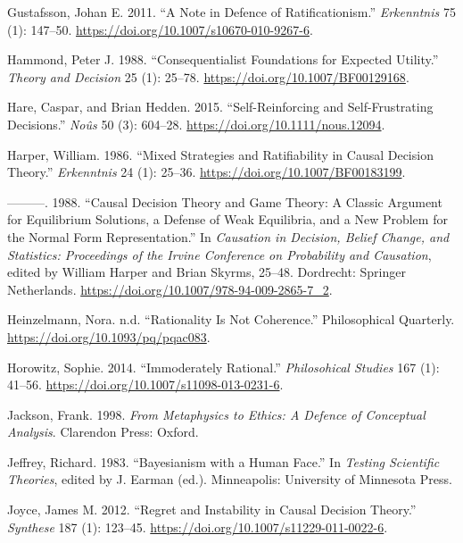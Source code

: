 \documentclass[
  12pt,
  letterpaper,
  DIV=11,
  numbers=noendperiod]{scrreprt}
\newlength{\cslhangindent}
\newlength{\cslentryspacingunit} %
\newenvironment{CSLReferences}[2] %
 {%
  \setlength{\parindent}{0pt}
  \ifodd #1
  \let\oldpar\par
  \def\par{\hangindent=\cslhangindent\oldpar}
  \fi
  \setlength{\parskip}{#2\cslentryspacingunit}
 }%
 {}
\begin{document}
\begin{CSLReferences}{1}{0}
\leavevmode{}%
Gustafsson, Johan E. 2011. {``A Note in Defence of Ratificationism.''}
\emph{Erkenntnis} 75 (1): 147--50.
\url{https://doi.org/10.1007/s10670-010-9267-6}.

\leavevmode{}%
Hammond, Peter J. 1988. {``Consequentialist Foundations for Expected
Utility.''} \emph{Theory and Decision} 25 (1): 25--78.
\url{https://doi.org/10.1007/BF00129168}.

\leavevmode{}%
Hare, Caspar, and Brian Hedden. 2015. {``Self-Reinforcing and
Self-Frustrating Decisions.''} \emph{Noûs} 50 (3): 604--28.
\url{https://doi.org/10.1111/nous.12094}.

\leavevmode{}%
Harper, William. 1986. {``Mixed Strategies and Ratifiability in Causal
Decision Theory.''} \emph{Erkenntnis} 24 (1): 25--36.
\url{https://doi.org/10.1007/BF00183199}.

\leavevmode{}%
---------. 1988. {``Causal Decision Theory and Game Theory: A Classic
Argument for Equilibrium Solutions, a Defense of Weak Equilibria, and a
New Problem for the Normal Form Representation.''} In \emph{Causation in
Decision, Belief Change, and Statistics: Proceedings of the Irvine
Conference on Probability and Causation}, edited by William Harper and
Brian Skyrms, 25--48. Dordrecht: Springer Netherlands.
\url{https://doi.org/10.1007/978-94-009-2865-7_2}.

\leavevmode{}%
Heinzelmann, Nora. n.d. {``Rationality Is Not Coherence.''}
Philosophical Quarterly. \url{https://doi.org/10.1093/pq/pqac083}.

\leavevmode{}%
Horowitz, Sophie. 2014. {``Immoderately Rational.''} \emph{Philosohical
Studies} 167 (1): 41--56.
\url{https://doi.org/10.1007/s11098-013-0231-6}.

\leavevmode{}%
Jackson, Frank. 1998. \emph{From Metaphysics to Ethics: A Defence of
Conceptual Analysis}. Clarendon Press: Oxford.

\leavevmode{}%
Jeffrey, Richard. 1983. {``Bayesianism with a Human Face.''} In
\emph{Testing Scientific Theories}, edited by J. Earman (ed.).
Minneapolis: University of Minnesota Press.

\leavevmode{}%
Joyce, James M. 2012. {``Regret and Instability in Causal Decision
Theory.''} \emph{Synthese} 187 (1): 123--45.
\url{https://doi.org/10.1007/s11229-011-0022-6}.


\end{CSLReferences}
\end{document}
